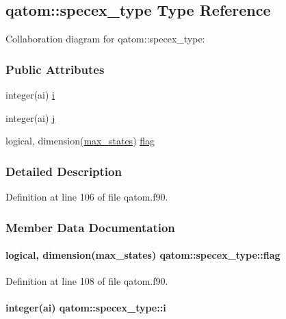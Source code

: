 \hypertarget{structqatom_1_1specex__type}{\subsection{qatom\-:\-:specex\-\_\-type Type Reference}
\label{structqatom_1_1specex__type}
}


Collaboration diagram for qatom\-:\-:specex\-\_\-type\-:
\subsubsection*{Public Attributes}
\begin{DoxyCompactItemize}
\item 
integer(ai) \hyperlink{structqatom_1_1specex__type_a7445ebf9510c5ff06821d2fac8216329}{i}
\item 
integer(ai) \hyperlink{structqatom_1_1specex__type_ae9ac255a69b9bcee28401ad76c13652f}{j}
\item 
logical, dimension(\hyperlink{classqatom_ad89179e7bcdef29e13211330d1b8fd20}{max\-\_\-states}) \hyperlink{structqatom_1_1specex__type_ab327cc8e78a88c591a15cec25437c6b0}{flag}
\end{DoxyCompactItemize}


\subsubsection{Detailed Description}


Definition at line 106 of file qatom.\-f90.



\subsubsection{Member Data Documentation}
\hypertarget{structqatom_1_1specex__type_ab327cc8e78a88c591a15cec25437c6b0}{
\paragraph[{flag}]{\setlength{\rightskip}{0pt plus 5cm}logical, dimension({\bf max\-\_\-states}) qatom\-::specex\-\_\-type\-::flag}}\label{structqatom_1_1specex__type_ab327cc8e78a88c591a15cec25437c6b0}


Definition at line 108 of file qatom.\-f90.

\hypertarget{structqatom_1_1specex__type_a7445ebf9510c5ff06821d2fac8216329}{
\paragraph[{i}]{\setlength{\rightskip}{0pt plus 5cm}integer(ai) qatom\-::specex\-\_\-type\-::i}}\label{structqatom_1_1specex__type_a7445ebf9510c5ff06821d2fac8216329}


